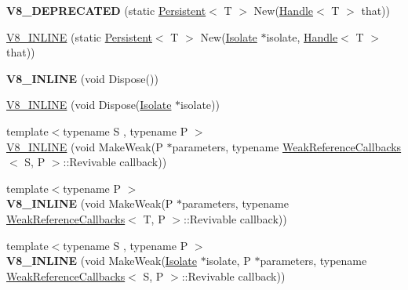 \begin{DoxyCompactItemize}
\item 
\hypertarget{classv8_1_1_persistent_ae4eaf2280b5caab67c009840f2db26c3}{}{\bfseries V8\+\_\+\+D\+E\+P\+R\+E\+C\+A\+T\+E\+D} (static \hyperlink{classv8_1_1_persistent}{Persistent}$<$ T $>$ New(\hyperlink{classv8_1_1_handle}{Handle}$<$ T $>$ that))\label{classv8_1_1_persistent_ae4eaf2280b5caab67c009840f2db26c3}

\item 
\hyperlink{classv8_1_1_persistent_ad38190b1fcec742b889e3850e41525dc}{V8\+\_\+\+I\+N\+L\+I\+N\+E} (static \hyperlink{classv8_1_1_persistent}{Persistent}$<$ T $>$ New(\hyperlink{classv8_1_1_isolate}{Isolate} $\ast$isolate, \hyperlink{classv8_1_1_handle}{Handle}$<$ T $>$ that))
\item 
\hypertarget{classv8_1_1_persistent_adae44eb24d3c568f9ab948d3efd3dbfa}{}{\bfseries V8\+\_\+\+I\+N\+L\+I\+N\+E} (void Dispose())\label{classv8_1_1_persistent_adae44eb24d3c568f9ab948d3efd3dbfa}

\item 
\hyperlink{classv8_1_1_persistent_aa0f3928a4dd02a35d174299346673846}{V8\+\_\+\+I\+N\+L\+I\+N\+E} (void Dispose(\hyperlink{classv8_1_1_isolate}{Isolate} $\ast$isolate))
\item 
{\footnotesize template$<$typename S , typename P $>$ }\\\hyperlink{classv8_1_1_persistent_ae24e248862bb3b5cfa1c16811636ee56}{V8\+\_\+\+I\+N\+L\+I\+N\+E} (void Make\+Weak(P $\ast$parameters, typename \hyperlink{classv8_1_1_weak_reference_callbacks}{Weak\+Reference\+Callbacks}$<$ S, P $>$\+::Revivable callback))
\item 
\hypertarget{classv8_1_1_persistent_af797ee43c3ca38e71d0854b2f96b4b3b}{}{\footnotesize template$<$typename P $>$ }\\{\bfseries V8\+\_\+\+I\+N\+L\+I\+N\+E} (void Make\+Weak(P $\ast$parameters, typename \hyperlink{classv8_1_1_weak_reference_callbacks}{Weak\+Reference\+Callbacks}$<$ T, P $>$\+::Revivable callback))\label{classv8_1_1_persistent_af797ee43c3ca38e71d0854b2f96b4b3b}

\item 
\hypertarget{classv8_1_1_persistent_a219c85987aa0da2aebd346eaed8e1ea3}{}{\footnotesize template$<$typename S , typename P $>$ }\\{\bfseries V8\+\_\+\+I\+N\+L\+I\+N\+E} (void Make\+Weak(\hyperlink{classv8_1_1_isolate}{Isolate} $\ast$isolate, P $\ast$parameters, typename \hyperlink{classv8_1_1_weak_reference_callbacks}{Weak\+Reference\+Callbacks}$<$ S, P $>$\+::Revivable callback))\label{classv8_1_1_persistent_a219c85987aa0da2aebd346eaed8e1ea3}


\end{DoxyCompactItemize}
